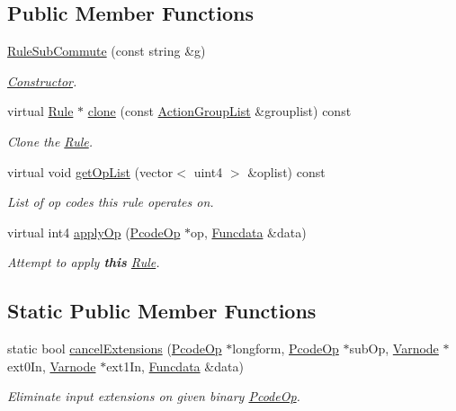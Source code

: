 \subsection*{Public Member Functions}
\begin{DoxyCompactItemize}
\item 
\mbox{\hyperlink{class_rule_sub_commute_a228696365bae90785d4c2bb901cf5611}{Rule\+Sub\+Commute}} (const string \&g)
\begin{DoxyCompactList}\small\item\em \mbox{\hyperlink{class_constructor}{Constructor}}. \end{DoxyCompactList}\item 
virtual \mbox{\hyperlink{class_rule}{Rule}} $\ast$ \mbox{\hyperlink{class_rule_sub_commute_a8f55fe42f0e9fe86ecf6ee4c152f5f7f}{clone}} (const \mbox{\hyperlink{class_action_group_list}{Action\+Group\+List}} \&grouplist) const
\begin{DoxyCompactList}\small\item\em Clone the \mbox{\hyperlink{class_rule}{Rule}}. \end{DoxyCompactList}\item 
virtual void \mbox{\hyperlink{class_rule_sub_commute_a4e7bf3fd94f49fcebed32fe2bac6b739}{get\+Op\+List}} (vector$<$ uint4 $>$ \&oplist) const
\begin{DoxyCompactList}\small\item\em List of op codes this rule operates on. \end{DoxyCompactList}\item 
virtual int4 \mbox{\hyperlink{class_rule_sub_commute_a346f3bfeee9d7233be7a17387ebc553f}{apply\+Op}} (\mbox{\hyperlink{class_pcode_op}{Pcode\+Op}} $\ast$op, \mbox{\hyperlink{class_funcdata}{Funcdata}} \&data)
\begin{DoxyCompactList}\small\item\em Attempt to apply {\bfseries{this}} \mbox{\hyperlink{class_rule}{Rule}}. \end{DoxyCompactList}\end{DoxyCompactItemize}
\subsection*{Static Public Member Functions}
\begin{DoxyCompactItemize}
\item 
static bool \mbox{\hyperlink{class_rule_sub_commute_a98082ac7f5395dbc0fd603a876417250}{cancel\+Extensions}} (\mbox{\hyperlink{class_pcode_op}{Pcode\+Op}} $\ast$longform, \mbox{\hyperlink{class_pcode_op}{Pcode\+Op}} $\ast$sub\+Op, \mbox{\hyperlink{class_varnode}{Varnode}} $\ast$ext0\+In, \mbox{\hyperlink{class_varnode}{Varnode}} $\ast$ext1\+In, \mbox{\hyperlink{class_funcdata}{Funcdata}} \&data)
\begin{DoxyCompactList}\small\item\em Eliminate input extensions on given binary \mbox{\hyperlink{class_pcode_op}{Pcode\+Op}}. \end{DoxyCompactList}\end{DoxyCompactItemize}
